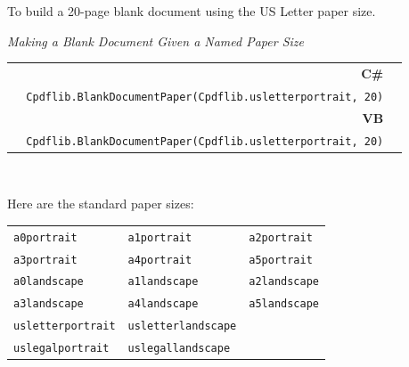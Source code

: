 \documentclass[a4paper]{memoir}
\newcommand{\smallgap}{\vspace{4mm}}
\begin{document}
To build a 20-page blank document using the US Letter paper size.
\begin{framed}
\noindent\textit{Making a Blank Document Given a Named Paper Size}\\

\noindent\begin{tabular}{rl}
\small\sffamily\textbf{C\#} &
\begin{minipage}{4in}
\small\verb!Pdf.pdfdoc pdf = !\\
\small\verb!  Cpdflib.BlankDocumentPaper(Cpdflib.usletterportrait, 20)!
\end{minipage}\\[5mm]
\small\sffamily\textbf{VB} &
\begin{minipage}{4in}
\small\verb!Dim pdf As Pdf.pdfdoc = !\\
\small\verb!  Cpdflib.BlankDocumentPaper(Cpdflib.usletterportrait, 20)!
\end{minipage}\\[5mm]
\end{tabular}\\

\end{framed}

Here are the standard paper sizes:

  \smallgap
  \begin{tabular}{lll}
  \texttt{a0portrait} & \texttt{a1portrait} & \texttt{a2portrait} \\
  \texttt{a3portrait} & \texttt{a4portrait} & \texttt{a5portrait} \\
  \texttt{a0landscape} & \texttt{a1landscape} & \texttt{a2landscape} \\
  \texttt{a3landscape} & \texttt{a4landscape} & \texttt{a5landscape} \\
  \texttt{usletterportrait} & \texttt{usletterlandscape} & \\
  \texttt{uslegalportrait} & \texttt{uslegallandscape} &
  \end{tabular}
\end{document}
